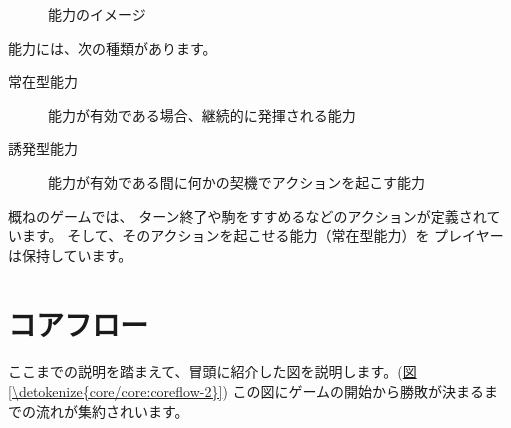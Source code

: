 \documentclass[letterpaper,10pt,dvipdfmx]{sphinxmanual}
\begin{document}
\begin{figure}[htbp]
\centering
\capstart

\noindent{}
\caption{能力のイメージ}\label{\detokenize{core/core:id18}}\label{\detokenize{core/core:ability-image}}\end{figure}

能力には、次の種類があります。
\begin{description}
\item[{常在型能力}] \leavevmode
能力が有効である場合、継続的に発揮される能力

\item[{誘発型能力}] \leavevmode
能力が有効である間に何かの契機でアクションを起こす能力

\end{description}

概ねのゲームでは、
ターン終了や駒をすすめるなどのアクションが定義されています。
そして、そのアクションを起こせる能力（常在型能力）を
プレイヤーは保持しています。


\section{コアフロー}
\label{\detokenize{core/core:id14}}
ここまでの説明を踏まえて、冒頭に紹介した図を説明します。(\hyperref[\detokenize{core/core:coreflow-2}]{図 \ref{\detokenize{core/core:coreflow-2}}})
この図にゲームの開始から勝敗が決まるまでの流れが集約されいます。
\end{document}
